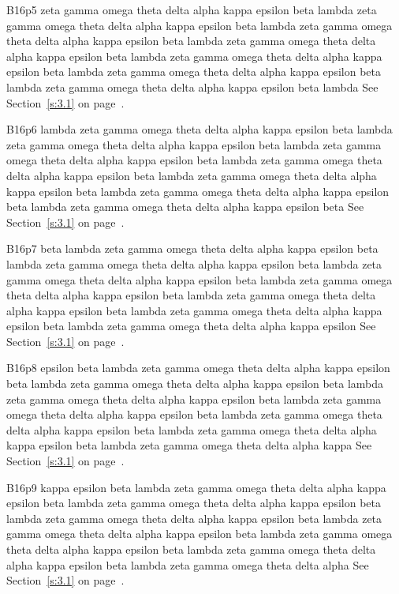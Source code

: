 B16p5 zeta gamma omega theta delta alpha kappa epsilon beta lambda zeta gamma omega theta delta alpha kappa epsilon beta lambda zeta gamma omega theta delta alpha kappa epsilon beta lambda zeta gamma omega theta delta alpha kappa epsilon beta lambda zeta gamma omega theta delta alpha kappa epsilon beta lambda zeta gamma omega theta delta alpha kappa epsilon beta lambda zeta gamma omega theta delta alpha kappa epsilon beta lambda See Section~\ref{s:3.1} on page~\pageref{s:3.1}.

B16p6 lambda zeta gamma omega theta delta alpha kappa epsilon beta lambda zeta gamma omega theta delta alpha kappa epsilon beta lambda zeta gamma omega theta delta alpha kappa epsilon beta lambda zeta gamma omega theta delta alpha kappa epsilon beta lambda zeta gamma omega theta delta alpha kappa epsilon beta lambda zeta gamma omega theta delta alpha kappa epsilon beta lambda zeta gamma omega theta delta alpha kappa epsilon beta See Section~\ref{s:3.1} on page~\pageref{s:3.1}.

B16p7 beta lambda zeta gamma omega theta delta alpha kappa epsilon beta lambda zeta gamma omega theta delta alpha kappa epsilon beta lambda zeta gamma omega theta delta alpha kappa epsilon beta lambda zeta gamma omega theta delta alpha kappa epsilon beta lambda zeta gamma omega theta delta alpha kappa epsilon beta lambda zeta gamma omega theta delta alpha kappa epsilon beta lambda zeta gamma omega theta delta alpha kappa epsilon See Section~\ref{s:3.1} on page~\pageref{s:3.1}.

B16p8 epsilon beta lambda zeta gamma omega theta delta alpha kappa epsilon beta lambda zeta gamma omega theta delta alpha kappa epsilon beta lambda zeta gamma omega theta delta alpha kappa epsilon beta lambda zeta gamma omega theta delta alpha kappa epsilon beta lambda zeta gamma omega theta delta alpha kappa epsilon beta lambda zeta gamma omega theta delta alpha kappa epsilon beta lambda zeta gamma omega theta delta alpha kappa See Section~\ref{s:3.1} on page~\pageref{s:3.1}.

B16p9 kappa epsilon beta lambda zeta gamma omega theta delta alpha kappa epsilon beta lambda zeta gamma omega theta delta alpha kappa epsilon beta lambda zeta gamma omega theta delta alpha kappa epsilon beta lambda zeta gamma omega theta delta alpha kappa epsilon beta lambda zeta gamma omega theta delta alpha kappa epsilon beta lambda zeta gamma omega theta delta alpha kappa epsilon beta lambda zeta gamma omega theta delta alpha See Section~\ref{s:3.1} on page~\pageref{s:3.1}.

